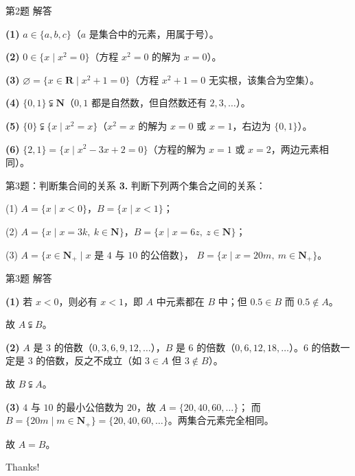 \documentclass[10pt,aspectratio=169,serif]{beamer}
\begin{document}
\begin{frame}[t]{第2题 解答}
\begin{tcolorbox}[colback=orange!10,colframe=orange,title=\textbf{解}]
\textbf{(1)} $a \in \{a,b,c\}$（$a$ 是集合中的元素，用属于号）。

\vspace{0.3em}
\textbf{(2)} $0 \in \{x \mid x^2 = 0\}$（方程 $x^2 = 0$ 的解为 $x=0$）。

\vspace{0.3em}
\textbf{(3)} $\varnothing = \{x \in \mathbf{R} \mid x^2 + 1 = 0\}$（方程 $x^2+1=0$ 无实根，该集合为空集）。

\vspace{0.3em}
\textbf{(4)} $\{0, 1\} \subsetneqq \mathbf{N}$（$0,1$ 都是自然数，但自然数还有 $2,3,\dots$）。

\vspace{0.3em}
\textbf{(5)} $\{0\} \subsetneqq \{x \mid x^2 = x\}$（$x^2=x$ 的解为 $x=0$ 或 $x=1$，右边为 $\{0,1\}$）。

\vspace{0.3em}
\textbf{(6)} $\{2, 1\} = \{x \mid x^2 - 3x + 2 = 0\}$（方程的解为 $x=1$ 或 $x=2$，两边元素相同）。
\end{tcolorbox}
\end{frame}

\begin{frame}[t]{第3题：判断集合间的关系}
\textbf{3.} 判断下列两个集合之间的关系：

\vspace{0.5em}
(1) $A = \{x \mid x < 0\}$，$B = \{x \mid x < 1\}$；

\vspace{0.5em}
(2) $A = \{x \mid x = 3k,\ k \in \mathbf{N}\}$，$B = \{x \mid x = 6z,\ z \in \mathbf{N}\}$；

\vspace{0.5em}
(3) $A = \{x \in \mathbf{N}_+ \mid x \text{ 是 } 4 \text{ 与 } 10 \text{ 的公倍数}\}$，
$B = \{x \mid x = 20m,\ m \in \mathbf{N}_+\}$。
\end{frame}

\begin{frame}[t]{第3题 解答}
\begin{tcolorbox}[colback=orange!10,colframe=orange,title=\textbf{解}]
\textbf{(1)} 若 $x < 0$，则必有 $x < 1$，即 $A$ 中元素都在 $B$ 中；但 $0.5 \in B$ 而 $0.5 \notin A$。

\alert{故 $A \subsetneqq B$。}

\vspace{0.5em}
\textbf{(2)} $A$ 是 $3$ 的倍数（$0,3,6,9,12,\dots$），$B$ 是 $6$ 的倍数（$0,6,12,18,\dots$）。$6$ 的倍数一定是 $3$ 的倍数，反之不成立（如 $3 \in A$ 但 $3 \notin B$）。

\alert{故 $B \subsetneqq A$。}

\vspace{0.5em}
\textbf{(3)} $4$ 与 $10$ 的最小公倍数为 $20$，故 $A = \{20, 40, 60, \dots\}$；
而 $B = \{20m \mid m \in \mathbf{N}_+\} = \{20, 40, 60, \dots\}$。两集合元素完全相同。

\alert{故 $A = B$。}
\end{tcolorbox}
\end{frame}

\begin{frame}[c]
  \begin{center}
    {\Huge\calligra Thanks!}
  \end{center}
\end{frame}
\end{document}
